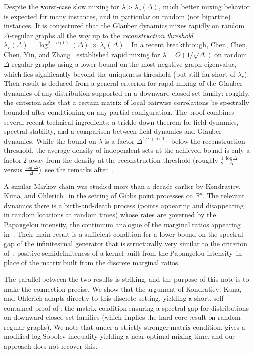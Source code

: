 \documentclass[10pt]{amsart}
\begin{document}
	
	Despite the worst-case slow mixing for $\lambda > \lambda_c(\Delta)$, much 
	better mixing behavior is expected for many instances, and in particular on random (not bipartite) instances. It is conjectured that the Glauber dynamics mixes rapidly  on random $\Delta$-regular graphs  all the way up to the \textit{reconstruction threshold} 
	$\lambda_r(\Delta) = \log ^{2+o(1)} (\Delta) \gg  \lambda_c(\Delta)$~\cite{brightwell2004second,bhatnagar2016decay}.   In a recent breakthrough, Chen, Chen, Chen, Yin, and Zhang~\cite{chen2025rapid} established rapid mixing 
	for $\lambda = O(1/\sqrt{\Delta})$ on random $\Delta$-regular graphs using a lower bound on the most negative graph eigenvalue, which lies significantly beyond the uniqueness threshold (but still far short of $\lambda_r$).  Their result is deduced 
	from a general criterion for rapid mixing of the Glauber dynamics of any distribution supported on a downward-closed set family: roughly, the criterion asks that a certain matrix 
	of local pairwise correlations be spectrally bounded after conditioning on any partial configuration. The proof combines several recent technical ingredients: a trickle-down theorem for field dynamics, spectral stability, and a comparison between field dynamics and Glauber dynamics.  While the bound on $\lambda$ is a factor $\Delta^{1/2 +o(1)}$ below  the reconstruction threshold, the average density of independent sets at the achieved bound is only a factor $2$ away from the density at the reconstruction threshold (roughly $\frac{1}{2} \frac{\log \Delta}{\Delta}$ versus $\frac{\log \Delta}{\Delta}$); see the remarks after~\cite[Theorem 1.1]{chen2025rapid}.
	
	
	
	
	A similar Markov chain 
	was studied more than a decade earlier by Kondratiev, Kuna, and Ohlerich~\cite{kondratiev2013spectral} in the setting of Gibbs point processes on $\mathbb{R}^d$. The relevant 
	dynamics there is a birth-and-death process (points appearing and disappearing in random locations at random times) whose rates are governed by the Papangelou intensity, the continuum analogue of the marginal ratios appearing in~\cite{chen2025rapid}. Their main result is a sufficient condition for a lower bound on the
	spectral gap of the infinitesimal generator that is structurally very similar to the criterion of~\cite{chen2025rapid}: positive-semidefiniteness of a kernel built from the Papangelou intensity, in place of the matrix built 
	from the discrete marginal ratios.
	
	
	The parallel between the two results is striking, and the purpose of this note is to make the connection precise.  
	We show that the argument of Kondratiev, Kuna, and Ohlerich adapts directly to this discrete setting, yielding a short, self-contained proof of \cite[Theorem~1.9]{chen2025rapid}: the matrix condition ensuring a spectral gap for distributions on downward-closed set families (which implies the hard-core result on random regular graphs).
	We note that under a strictly stronger matrix condition, \cite[Theorem~1.8]{chen2025rapid} gives a modified log-Sobolev inequality yielding a near-optimal mixing time, and our approach does not recover this.
	
\end{document}
